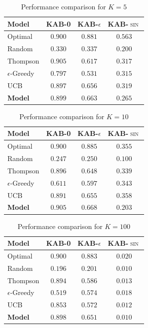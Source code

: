 \begin{table}[H]
\centering
\caption{Performance comparison for $K=5$}
\label{tab:k5}
\begin{tabular}{l c c c}
\toprule
\textbf{Model} & \textbf{\textsc{KAB-0}} & \textbf{\textsc{KAB-$\epsilon$}} & \textbf{\textsc{KAB-$\sin$}}\\
\midrule
Optimal & $0.900$ & $0.881$ & $0.563$ \\
Random & $0.330$ & $0.337$ & $0.200$ \\
\midrule
Thompson & $0.905$ & $0.617$ & $0.317$ \\
$\epsilon$-Greedy & $0.797$ & $0.531$ & $0.315$ \\
UCB & $0.897$ & $0.656$ & $0.319$ \\
\textbf{Model} & $\mathbf{0.899}$ & $\mathbf{0.663}$ & $\mathbf{0.265}$ \\

\bottomrule
\end{tabular}
\end{table}

\begin{table}[H]
\centering
\caption{Performance comparison for $K=10$}
\label{tab:k10}
\begin{tabular}{l c c c}
\toprule
\textbf{Model} & \textbf{\textsc{KAB-0}} & \textbf{\textsc{KAB-$\epsilon$}} & \textbf{\textsc{KAB-$\sin$}} \\
\midrule
Optimal & $0.900$ & $0.885$ & $0.355$  \\
Random & $0.247$ & $0.250$ & $0.100$ \\
\midrule
Thompson & $0.896$ & $0.648$ & $0.339$ \\

$\epsilon$-Greedy & $0.611$ & $0.597$ & $0.343$ \\
UCB & $0.891$ & $0.655$ & $0.358$ \\
\textbf{Model} & $\mathbf{0.905}$ & $\mathbf{0.668}$ & $\mathbf{0.203}$  \\
\bottomrule
\end{tabular}
\end{table}

\begin{table}[H]
\centering
\caption{Performance comparison for $K=100$}
\label{tab:k100}
\begin{tabular}{l c c c}
\toprule
\textbf{Model} & \textbf{\textsc{KAB-0}} & \textbf{\textsc{KAB-$\epsilon$}} & \textbf{\textsc{KAB-$\sin$}} \\
\midrule
Optimal & $0.900$ & $0.883$ & $0.020$  \\
Random & $0.196$ & $0.201$ & $0.010$ \\
\midrule
Thompson & $0.894$ & $0.586$ & $0.013$ \\
$\epsilon$-Greedy & $0.519$ & $0.574$ & $0.018$ \\
UCB & $0.853$ & $0.572$ & $0.012$ \\
\textbf{Model} & $\mathbf{0.898}$ & $\mathbf{0.651}$ & $\mathbf{0.010}$  \\
\bottomrule
\end{tabular}
\end{table}

